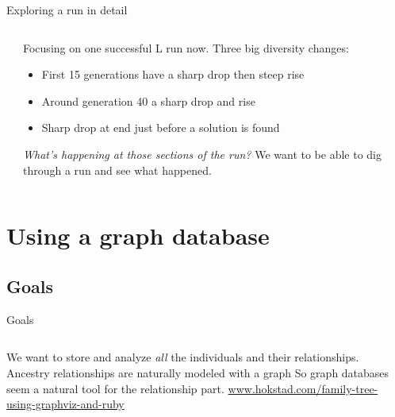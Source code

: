 \documentclass{beamer}
\newcommand{\linespace}{\vskip 0.25cm}
\begin{document}
\begin{frame}{Exploring a run in detail}
	
	\begin{columns}
		\begin{column}{0.55 \linewidth}
			\centering
		\end{column}
		
		\begin{column}{0.4 \linewidth}
			\begin{overprint}
				Focusing on one successful L run now.
				\linespace
				Three big diversity changes:
				\begin{itemize}
					\item First 15 generations have a sharp drop then steep rise
					\item Around generation 40 a sharp drop and rise
					\item Sharp drop at end just before a solution is found
				\end{itemize}
				
				\emph{What's happening at those sections of the run?}
				\linespace
				We want to be able to dig through a run and see what happened.
			\end{overprint}
		\end{column}
	\end{columns}
\end{frame}

\section[Using a graph DB]{Using a graph database}

\subsection{Goals}

\begin{frame}{Goals}
	\begin{columns}
		\begin{column}{0.6 \linewidth}
					We want to store and analyze \emph{all} the individuals and their relationships.
					\linespace
					Ancestry relationships are naturally modeled with a graph
					\linespace
					So graph databases seem a natural tool for the relationship part.
					\linespace
					\centering
					\tiny{\url{www.hokstad.com/family-tree-using-graphviz-and-ruby}}
		\end{column}
		\begin{column}{0.4 \linewidth}
			\tiny{\cite{Burlacu:2013:VGL:2464576.2482714}}
		\end{column}		
	\end{columns}
\end{frame}
\end{document}
